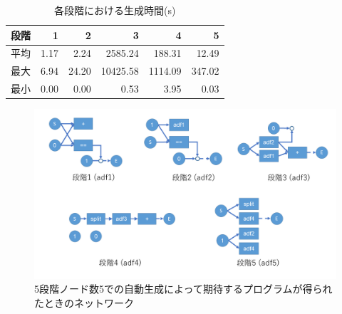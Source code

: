 \documentclass[exploratorypaper]{jsaiart} %
\begin{document}
\begin{table}[htbp]
\caption{各段階における生成時間(s)}
\label{tbl:result3}
\begin{tabular}{c|rrrrr}
    段階&	1&	2&	3&	4&	5\\
    \hline
    \hline
    平均&	1.17&	2.24&	2585.24&	188.31&     12.49\\
    最大&	6.94&	24.20&	10425.58&	1114.09&	347.02\\
    最小&	0.00&	0.00&	0.53&	    3.95&	    0.03\\
    \hline
\end{tabular}
\end{table}



\begin{figure}[t]
    \begin{center}
        \includegraphics[width=150mm]{out_net_p5n5.png}
    \end{center}
    \capwidth=130mm %
    \caption{5段階ノード数5での自動生成によって期待するプログラムが得られたときのネットワーク}
    \label{fig:out_net_p5n5}
\end{figure}
\end{document}

